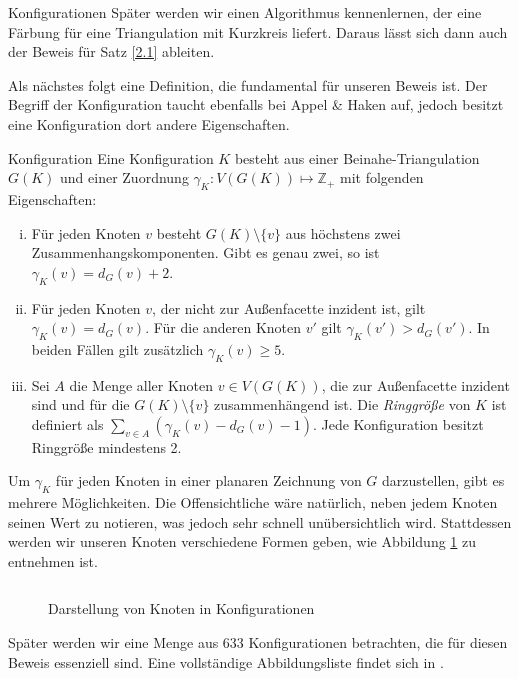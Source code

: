 \begin{section}{Konfigurationen}
 Später werden wir einen Algorithmus kennenlernen, der eine Färbung für eine Triangulation mit Kurzkreis liefert. Daraus lässt sich dann auch der Beweis für Satz \ref{2.1} ableiten.
 
 Als nächstes folgt eine Definition, die fundamental für unseren Beweis ist. Der Begriff der Konfiguration taucht ebenfalls bei Appel \& Haken auf, jedoch besitzt eine Konfiguration dort andere Eigenschaften.
  
 \begin{definition}{Konfiguration}
  Eine Konfiguration $K$ besteht aus einer Beinahe-Triangulation $G(K)$ und einer Zuordnung $\gamma_K : V(G(K)) \mapsto \mathbb{Z}_+$ mit folgenden Eigenschaften:
  \begin{enumerate}[i)]
   \item Für jeden Knoten $v$ besteht $G(K) \setminus \{v\}$ aus höchstens zwei Zusammenhangskomponenten. Gibt es genau zwei, so ist $\gamma_K(v) = d_G(v) + 2$.
   \item Für jeden Knoten $v$, der nicht zur Außenfacette inzident ist, gilt $\gamma_K(v) = d_G(v)$. Für die anderen Knoten $v'$ gilt $\gamma_K(v') > d_G(v')$. In beiden Fällen gilt zusätzlich $\gamma_K(v) \geq 5$.
   \item Sei $A$ die Menge aller Knoten $v \in V(G(K))$, die zur Außenfacette inzident sind und für die $G(K) \setminus \{v\}$ zusammenhängend ist. Die \textit{Ringgröße} von $K$ ist definiert als $\sum_{v\in A} (\gamma_K(v) - d_G(v) - 1)$. Jede Konfiguration besitzt Ringgröße mindestens 2.
  \end{enumerate}
 \end{definition}
 
 Um $\gamma_K$ für jeden Knoten in einer planaren Zeichnung von $G$ darzustellen, gibt es mehrere Möglichkeiten. Die Offensichtliche wäre natürlich, neben jedem Knoten seinen Wert zu notieren, was jedoch sehr schnell unübersichtlich wird. Stattdessen werden wir unseren Knoten verschiedene Formen geben, wie Abbildung \ref{fig1} zu entnehmen ist.
 
 \begin{figure}[ht]
  \label{fig1}
 \[  \]
  \caption[Darstellung von Knoten in Konfigurationen]{Darstellung von Knoten in Konfigurationen}
 \end{figure}

 
 Später werden wir eine Menge aus 633 Konfigurationen betrachten, die für diesen Beweis essenziell sind. Eine vollständige Abbildungsliste findet sich in \cite[Seite 35]{FourRSST}. 
 

\end{section}

